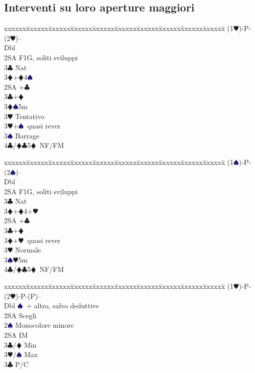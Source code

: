 \documentclass[a4paper,italian]{article}
\newcommand{\BC}{\textcolor{OliveGreen}{$\clubsuit$}}
\newcommand{\BD}{\textcolor{RedOrange}{$\vardiamondsuit$}}
\newcommand{\BH}{\textcolor{Red2}{$\varheartsuit${}}}
\newcommand{\BS}{\textcolor{MidnightBlue}{$\spadesuit${}}}
\newenvironment{bidtable}
{\begin{tabbing}

    xxxxxx\=xxxxxx\=xxxxxx\=xxxxxx\=xxxxxx\=xxxxxx\=xxxxxx\=xxxxxx\=xxxxxx\=xxxxxx\=\kill}
{\end{tabbing} }%
\begin{document}
\begin{multicols}{2}
    \subsection{Interventi su loro aperture maggiori}

    \begin{bidtable}
        (1\BH)-P-(2\BH)--\+\\
        Dbl\+\\
        2SA \> F1G, soliti sviluppi\\
        3\BC\> Nat\+\\
        3\BD {}+\BD4\BS \-\-\\
        2SA +\BC \\
        3\BC {}+\BD \\
        3\BD {}\BS 5m\+\\
        3\BH \> Tentativo\-\\
        3\BH {}+\BS\ quasi rever\\
        3\BS \> Barrage\\
        4\BC/\BD {}\BC 5\BD\ NF/FM
    \end{bidtable}
    \begin{bidtable}
        (1\BS)-P-(2\BS)--\+\\
        Dbl\+\\
        2SA \> F1G, soliti sviluppi\\
        3\BC\> Nat\+\\
        3\BD {}+\BD4+\BH \-\-\\
        2SA +\BC \\
        3\BC {}+\BD \\
        3\BD {}+\BH\ quasi rever\\
        3\BH \> Normale\\
        3\BS {}\BH 5m\\
        4\BC/\BD {}\BC 5\BD\ NF/FM
    \end{bidtable}
    \vfill\null
    \columnbreak
    \begin{bidtable}
        (1\BH)-P-(2\BH)-P-(P)--\+\\
        Dbl \BS\ + altro, salvo deduttive\\
        \>2SA Scegli\\
        2\BS \> Monocolore minore\+\\
        2SA \> IM\+\\
        3\BC/\BD \> Min\\
        3\BH/\BS \> Max\-\\
        3\BC \> P/C\-\\

\end{bidtable}
\end{multicols}
\end{document}

